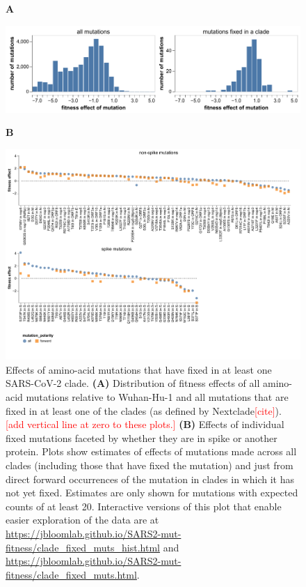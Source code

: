 \documentclass[9pt,twocolumn,twoside]{gsajnl_modified}
\newcommand\jdbcomment[1]{\textcolor{red}{[#1]}}
\begin{document}
\begin{figure}
{\bf \Large A}

\includegraphics[width=0.8\linewidth]{figs/clade_fixed_muts_hist.pdf}
\vspace{0.05in}

{\bf \Large B}

\includegraphics[width=\linewidth]{figs/clade_fixed_muts.pdf}

\caption{
Effects of amino-acid mutations that have fixed in at least one SARS-CoV-2 clade.
{\bf (A)}
Distribution of fitness effects of all amino-acid mutations relative to Wuhan-Hu-1 and all mutations that are fixed in at least one of the clades (as defined by Nextclade\jdbcomment{cite}).
\jdbcomment{add vertical line at zero to these plots.}
{\bf (B)}
Effects of individual fixed mutations faceted by whether they are in spike or another protein.
Plots show estimates of effects of mutations made across all clades (including those that have fixed the mutation) and just from direct forward occurrences of the mutation in clades in which it has not yet fixed.
Estimates are only shown for mutations with expected counts of at least 20.
Interactive versions of this plot that enable easier exploration of the data are at \url{https://jbloomlab.github.io/SARS2-mut-fitness/clade_fixed_muts_hist.html} and \url{https://jbloomlab.github.io/SARS2-mut-fitness/clade_fixed_muts.html}.
\label{fig:fixed}
}
\end{figure}
\end{document}
